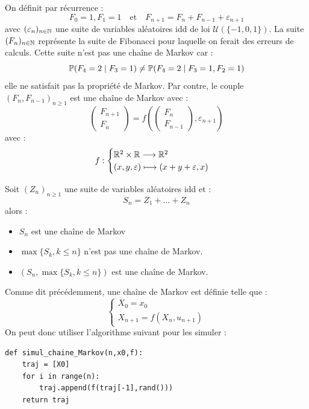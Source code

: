 \begin{example}
    On définit par récurrence : 
        $$ F_0 = 1, F_1 = 1 \quad \text{et} \quad F_{n+1} = F_{n} + F_{n-1} + \varepsilon_{n+1} $$ 
    avec $( \varepsilon_n)_{n \in \mathbb{N}}$ une suite de variables aléatoires idd de loi $ \mathcal{U}(\{-1,0, 1\})$. 
    La suite $(F_n)_{n \in \mathbb{N}}$ représente la suite de Fibonacci pour laquelle on ferait des erreurs de calculs. 
    Cette suite n'est pas une chaîne de Markov car : 
        $$ \mathbb{P}(F_4 = 2 \; | \; F_3 = 1) \not = \mathbb{P}(F_4 = 2 \; | \; F_3 = 1, F_2 = 1) $$ 
    elle ne satisfait pas la propriété de Markov. Par contre, le couple $(F_n, F_{n-1})_{n \geqslant 1}$ est une 
    chaîne de Markov avec : 
        $$
            \begin{pmatrix}
                F_{n+1} \\ 
                F_n 
            \end{pmatrix}
            = 
            f \left(
                \begin{pmatrix}
                    F_n \\ 
                    F_{n-1}
                \end{pmatrix}, 
                \varepsilon_{n+1}
            \right)
        $$ 
    avec : 
        $$ f : 
            \begin{cases}
                \mathbb{R}^2 \times \mathbb{R} \longrightarrow \mathbb{R}^2 \\ 
                (x,y, \varepsilon) \longmapsto (x+y+ \varepsilon, x)
            \end{cases}
        $$
\end{example}

\begin{remark}
    Soit $(Z_n)_{n \geqslant 1}$ une suite de variables aléatoires idd et : 
        $$ S_n = Z_1 + \dots + Z_n $$ 
    alors : 
        \begin{itemize}
            \item $S_n$ est une chaîne de Markov 
            \item $ \max \{S_k, k \leqslant n\}$ n'est pas une chaîne de Markov. 
            \item $(S_n, \max \{S_k, k \leqslant n\})$ est une chaîne de Markov. 
        \end{itemize}
\end{remark}

\begin{proposition}
    Comme dit précédemment, une chaîne de Markov est définie telle que : 
        $$ 
            \begin{cases}
                X_0 = x_0 \\ 
                X_{n+1} = f(X_n, u_{n+1})
            \end{cases}    
        $$
    On peut donc utiliser l'algorithme suivant pour les simuler : 
\begin{lstlisting}
def simul_chaine_Markov(n,x0,f): 
    traj = [X0]
    for i in range(n): 
        traj.append(f(traj[-1],rand()))
    return traj
\end{lstlisting}
\end{proposition}

